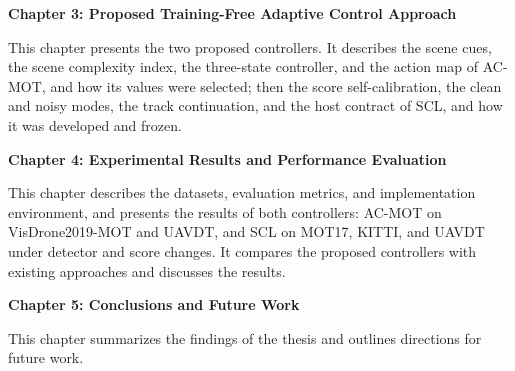 \textbf{Chapter 3: Proposed Training-Free Adaptive Control Approach}

This chapter presents the two proposed controllers. It describes the scene cues, the scene complexity index, the three-state controller, and the action map of AC-MOT, and how its values were selected; then the score self-calibration, the clean and noisy modes, the track continuation, and the host contract of SCL, and how it was developed and frozen.

\textbf{Chapter 4: Experimental Results and Performance Evaluation}

This chapter describes the datasets, evaluation metrics, and implementation environment, and presents the results of both controllers: AC-MOT on VisDrone2019-MOT and UAVDT, and SCL on MOT17, KITTI, and UAVDT under detector and score changes. It compares the proposed controllers with existing approaches and discusses the results.

\textbf{Chapter 5: Conclusions and Future Work}

This chapter summarizes the findings of the thesis and outlines directions for future work.
